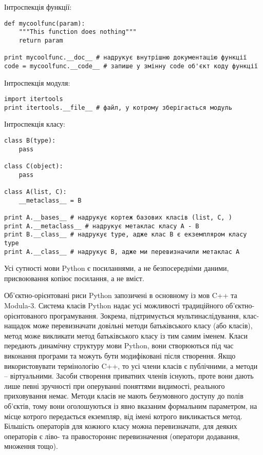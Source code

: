 \documentclass[a4paper, 12pt, onsedie]{article}
\begin{document}
Інтроспекція функції:

\begin{verbatim}
def mycoolfunc(param):
    """This function does nothing"""
    return param

print mycoolfunc.__doc__ # надрукує внутрішню документацію функції
code = mycoolfunc.__code__ # запише у змінну code об'єкт коду функції
\end{verbatim}

Інтроспекція модуля:

\begin{verbatim}
import itertools
print itertools.__file__ # файл, у котрому зберігається модуль
\end{verbatim}

Інтроспекція класу:

\begin{verbatim}
class B(type):
    pass

class C(object):
    pass

class A(list, C):
    __metaclass__ = B

print A.__bases__ # надрукує кортеж базових класів (list, C, )
print A.__metaclass__ # надрукує метаклас класу A - B
print B.__class__ # надрукує type, адже клас B є екземпляром класу type
print A.__class__ # надрукує B, адже ми перевизначили метаклас A
\end{verbatim}

Усі сутності мови Python є посиланнями, а не
безпосередніми даними, присвоювання копіює посилання, а не вміст. 

Об'єктно-орієнтовані риси Python запозичені в основному із мов C++ та Modula-3. Система 
класів Python надає усі можливості традиційного об'єктно-орієнтованого програмування.
Зокрема, підтримується мультинаслідування, клас-нащадок може перевизначати довільні методи 
батьківського класу (або класів), метод може викликати метод батьківського класу із тим 
самим іменем. Класи передають динамічну структуру мови Python, вони створюються під час 
виконання програми та можуть бути модифіковані після створення. Якщо використовувати 
термінологію C++, то усі члени класів є публічними, а методи -- віртуальними. Засоби 
створення приватних членів існують, проте вони дають лише певні зручності при оперуванні 
поняттями видимості, реального приховування немає. Методи класів не мають безумовного 
доступу до полів об'єктів, тому вони оголошуються із явно вказаним формальним параметром, 
на місце котрого передається екземпляр, від імені котрого викликається метод. Більшість 
операторів для кожного класу можна перевизначати, для деяких операторів є ліво- та 
правостороннє перевизначення (оператори додавання, множення тощо).
\end{document}
